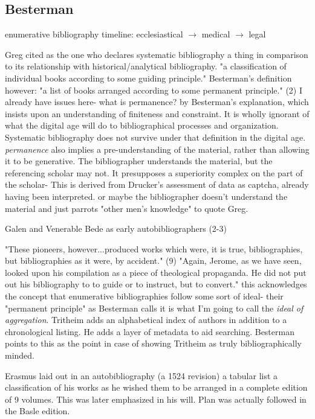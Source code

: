 \documentclass[course, english]{Notes}
\newcommand{\n}{\scalebox{2}{\textbf{\framebox{$\aleph$} } } }
\begin{document}
\subsection{Besterman}
\begin{outline}

\1 enumerative bibliography timeline: \linebreak
ecclesiastical $\rightarrow$ medical $\rightarrow$ legal

\1 Greg cited as the one who declares systematic bibliography a thing in comparison to its relationship with historical/analytical bibliography.
	\2 "a classification of individual books according to some guiding principle."
\1 Besterman's definition however: "a list of books arranged according to some permanent principle." (2)
	\2 \n I already have issues here- what is permanence? 
		\3 by Besterman's explanation, which insists upon an understanding of finiteness and constraint. It is wholly ignorant of what the digital age will do to bibliographical processes and organization. Systematic bibliography does not survive under that definition in the digital age. 
		\3 \textit{permanence} also implies a pre-understanding of the material, rather than allowing it to be generative. The bibliographer understands the material, but the referencing scholar may not. It presupposes a superiority complex on the part of the scholar- This is derived from Drucker's assessment of data as captcha, already having been interpreted. 
			\4 or maybe the bibliographer doesn't understand the material and just parrots "other men's knowledge" to quote Greg. 

\1 Galen and Venerable Bede as early autobibliographers (2-3)
 
\1 "These pioneers, however...produced works which were, it is true, bibliographies, but bibliographies as it were, by accident." (9)
	\2 "Again, Jerome, as we have seen, looked upon his compilation as a piece of theological propaganda. He did not put out his bibliography to to guide or to instruct, but to convert." 
		\3 \n this acknowledges the concept that enumerative bibliographies follow some sort of ideal- their "permanent principle" as Besterman calls it is what I'm going to call the \textit{ideal of aggregation}.
	\2 Tritheim adds an alphabetical index of authors in addition to a chronological listing. He adds a layer of metadata to aid searching. Besterman points to this as the point in case of showing Tritheim as truly bibliographically minded. 
	
\1 Erasmus laid out in an autobibliography (a 1524 revision) a tabular list a classification of his works as he wished them to be arranged in a complete edition of 9 volumes. This was later emphasized in his will. Plan was actually followed in the Basle edition. 


\end{outline}
\end{document}
